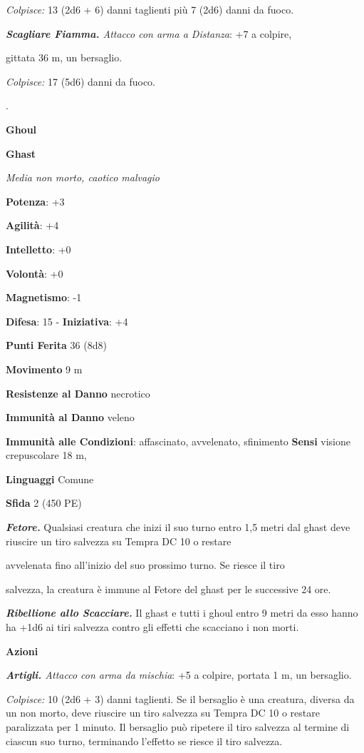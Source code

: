 \begin{multicols}{2}
\emph{Colpisce:} 13 (2d6 + 6) danni taglienti più 7 (2d6) danni da
fuoco.

\emph{\textbf{Scagliare Fiamma.} Attacco con arma a Distanza}: +7 a
colpire,

gittata 36 m, un bersaglio.

\emph{Colpisce:} 17 (5d6) danni da fuoco.

.

\textbf{Ghoul}

\textbf{Ghast}

\emph{Media non morto, caotico malvagio}

\textbf{Potenza}: +3

\textbf{Agilità}: +4

\textbf{Intelletto}: +0

\textbf{Volontà}: +0

\textbf{Magnetismo}: -1

\textbf{Difesa}: 15 - \textbf{Iniziativa}: +4

\textbf{Punti Ferita} 36 (8d8)

\textbf{Movimento} 9 m

\textbf{Resistenze al Danno} necrotico

\textbf{Immunità al Danno} veleno

\textbf{Immunità alle Condizioni}: affascinato, avvelenato, sfinimento
\textbf{Sensi} visione crepuscolare 18 m, 

\textbf{Linguaggi} Comune

\textbf{Sfida} 2 (450 PE)\smallskip

\emph{\textbf{Fetore.}} Qualsiasi creatura che inizi il suo turno entro
1,5 metri dal ghast deve riuscire un tiro salvezza su Tempra DC 10
o restare

avvelenata fino all'inizio del suo prossimo turno. Se riesce il tiro

salvezza, la creatura è immune al Fetore del ghast per le successive 24
ore.

\emph{\textbf{Ribellione allo Scacciare.}} Il ghast e tutti i ghoul
entro 9 metri da esso hanno ha +1d6 ai tiri salvezza contro gli
effetti che scacciano i non morti.

\smallskip\textbf{Azioni}

\emph{\textbf{Artigli.} Attacco con arma da mischia}: +5 a colpire,
portata 1 m, un bersaglio.

\emph{Colpisce:} 10 (2d6 + 3) danni taglienti. Se il bersaglio è una
creatura, diversa da un non morto, deve riuscire un tiro salvezza su Tempra DC 10 o restare paralizzata per 1 minuto. Il bersaglio può
ripetere il tiro salvezza al termine di ciascun suo turno, terminando
l'effetto se riesce il tiro salvezza.


\end{multicols}
